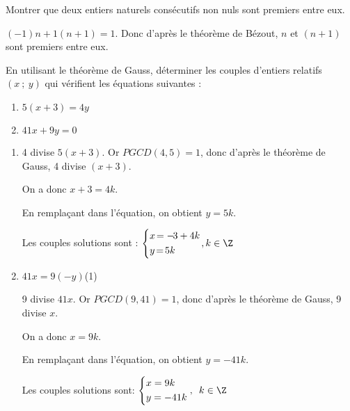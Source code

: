\documentclass{cornouaille}
\begin{document}
\begin{exercice}
  Montrer que deux entiers naturels consécutifs non nuls sont premiers
  entre eux.
\end{exercice}
\begin{solution}
  $(-1)n+1(n+1)=1$. Donc d'après le théorème de Bézout, $n$ et $(n+1)$
  sont premiers entre eux.
\end{solution}

\begin{exercice}
En utilisant le théorème de Gauss, déterminer les couples d'entiers
relatifs $(x\ ;\ y)$ qui vérifient les équations suivantes :


\begin{multicols}{2}
\begin{enumerate}
\item $5(x+3)=4y$
\item $41x+9y=0$
\end{enumerate}
\end{multicols}
\end{exercice}
\begin{solution}
  \begin{enumerate}
  \item 4 divise $5(x+3)$. Or $PGCD(4,5)=1$, donc d'après le théorème
    de Gauss, 4 divise $(x+3)$.

On  a donc $x+3=4k$. 

En remplaçant dans l'équation, on obtient $y=5k$.

Les couples solutions sont :
$\left\{\begin{aligned}
&x\hskip-.5mm=-\hskip-.5mm3+4k\\
&y\hskip-.5mm=\hskip-.5mm5k\end{aligned}\right.\hskip-.5mm, k\in\Z$

\item $41x=9(-y)$\enskip (1)

  9 divise $41x$. Or $PGCD(9,41)=1$, donc d'après le théorème de
  Gauss, 9 divise $x$.

On  a donc $x=9k$. 

En remplaçant dans l'équation, on obtient $y=-41k$.

Les couples solutions sont: 
$\left\{\begin{aligned}
&x=9k\\
&y=-41k\end{aligned}\right.,\enskip k\in\Z$
\end{enumerate}
\end{solution}
\end{document}
